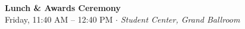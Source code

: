 \documentclass[
  10pt,
  letterpaper,
  DIV=11,
  numbers=noendperiod]{scrartcl}
\begin{document}
\vspace{1em}


\begin{center}
\colorbox{event!15}{\parbox{0.9\linewidth}{\centering
  \textcolor{event}{\large\textbf{Lunch \& Awards Ceremony}}\\[2pt]
  {\small Friday, 11:40 AM – 12:40 PM $\cdot$ \textit{Student Center, Grand Ballroom}}
}}
\end{center}
\end{document}
